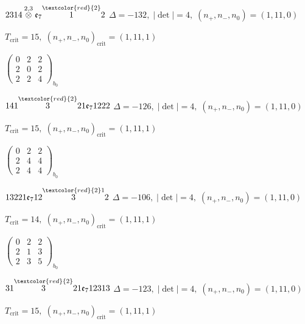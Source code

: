 \documentclass[10pt]{article}
\begin{document}
$2314\overset{2,3}{\otimes}\mathfrak{e}_7\overset{\textcolor{red}{2}}{1}2$ \quad $\Delta=-132,\; |\det|=4,\; (n_+,n_-,n_0)=(1,11,0)$

\hspace{1em}$T_{\text{crit}}=15,\; (n_+,n_-,n_0)_{\text{crit}}=(1,11,1)$

\hspace{2em}$\left(\begin{smallmatrix}0 & 2 & 2 \\ 2 & 0 & 2 \\ 2 & 2 & 4\end{smallmatrix}\right)_{\!b_0}$

\smallskip

$141\overset{\textcolor{red}{2}}{3}21\mathfrak{e}_71222$ \quad $\Delta=-126,\; |\det|=4,\; (n_+,n_-,n_0)=(1,11,0)$

\hspace{1em}$T_{\text{crit}}=15,\; (n_+,n_-,n_0)_{\text{crit}}=(1,11,1)$

\hspace{2em}$\left(\begin{smallmatrix}0 & 2 & 2 \\ 2 & 4 & 4 \\ 2 & 4 & 4\end{smallmatrix}\right)_{\!b_0}$

\smallskip

$13221\mathfrak{e}_712\overset{\textcolor{red}{2}1}{3}2$ \quad $\Delta=-106,\; |\det|=4,\; (n_+,n_-,n_0)=(1,11,0)$

\hspace{1em}$T_{\text{crit}}=14,\; (n_+,n_-,n_0)_{\text{crit}}=(1,11,1)$

\hspace{2em}$\left(\begin{smallmatrix}0 & 2 & 2 \\ 2 & 1 & 3 \\ 2 & 3 & 5\end{smallmatrix}\right)_{\!b_0}$

\smallskip

$31\overset{\textcolor{red}{2}}{3}21\mathfrak{e}_712313$ \quad $\Delta=-123,\; |\det|=4,\; (n_+,n_-,n_0)=(1,11,0)$

\hspace{1em}$T_{\text{crit}}=15,\; (n_+,n_-,n_0)_{\text{crit}}=(1,11,1)$
\end{document}
